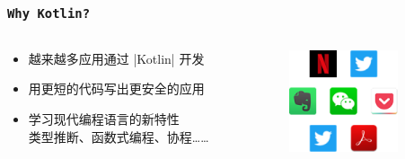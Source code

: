 \begin{frame}[fragile]
    \frametitle{\texttt{Why Kotlin?}}
    \begin{columns}
        \begin{column}{0.5\textwidth}
            \begin{itemize}
                \item 越来越多应用通过 |Kotlin| 开发
                \item 用更\textcolor{penroseblue}{短}的代码写出更\textcolor{penroseblue}{安全}的应用
                \item 学习现代编程语言的新特性\\类型推断、函数式编程、协程……
            \end{itemize}
        \end{column}
        \begin{column}{0.5\textwidth}
            \begin{figure}
            \begin{center}
                \includegraphics[height=3cm]{fig/apps.png}
            \end{center}
            \end{figure}
        \end{column}
    \end{columns}
\end{frame}
